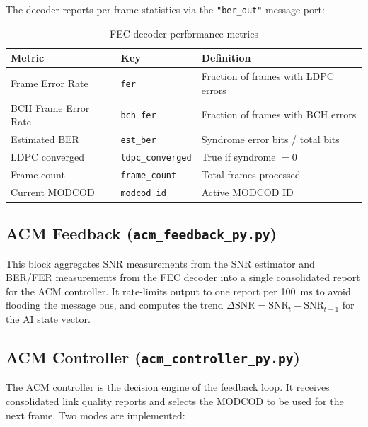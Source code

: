 \documentclass[12pt,a4paper]{report}
\begin{document}
The decoder reports per-frame statistics via the \texttt{"ber\_out"} message
port:

\begin{table}[H]
\centering
\caption{FEC decoder performance metrics}
\label{tab:fec_metrics}
\begin{tabular}{lll}
\toprule
\textbf{Metric}       & \textbf{Key}            & \textbf{Definition} \\
\midrule
Frame Error Rate      & \texttt{fer}            & Fraction of frames with LDPC errors \\
BCH Frame Error Rate  & \texttt{bch\_fer}       & Fraction of frames with BCH errors \\
Estimated BER         & \texttt{est\_ber}       & Syndrome error bits / total bits \\
LDPC converged        & \texttt{ldpc\_converged}& True if syndrome $= 0$ \\
Frame count           & \texttt{frame\_count}   & Total frames processed \\
Current MODCOD        & \texttt{modcod\_id}     & Active MODCOD ID \\
\bottomrule
\end{tabular}
\end{table}

\subsection{ACM Feedback (\texttt{acm\_feedback\_py.py})}

This block aggregates SNR measurements from the SNR estimator and BER/FER
measurements from the FEC decoder into a single consolidated report for the
ACM controller. It rate-limits output to one report per 100~ms to avoid
flooding the message bus, and computes the trend $\Delta\text{SNR} =
\text{SNR}_t - \text{SNR}_{t-1}$ for the AI state vector.

\subsection{ACM Controller (\texttt{acm\_controller\_py.py})}
\label{sec:acm_controller}

The ACM controller is the decision engine of the feedback loop. It receives
consolidated link quality reports and selects the MODCOD to be used for the
next frame. Two modes are implemented:
\end{document}

